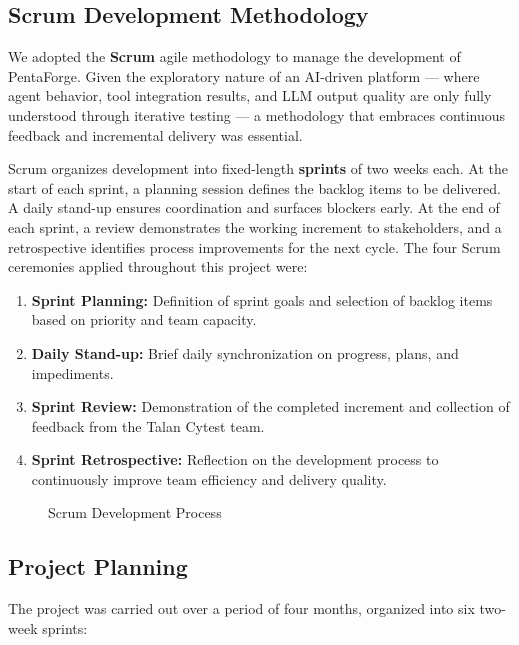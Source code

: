 \documentclass[12pt,a4paper]{report}
\begin{document}
\subsection{Scrum Development Methodology}

We adopted the \textbf{Scrum} agile methodology to manage the development of
PentaForge. Given the exploratory nature of an AI-driven platform --- where agent
behavior, tool integration results, and LLM output quality are only fully understood
through iterative testing --- a methodology that embraces continuous feedback and
incremental delivery was essential.

Scrum organizes development into fixed-length \textbf{sprints} of two weeks each.
At the start of each sprint, a planning session defines the backlog items to be
delivered. A daily stand-up ensures coordination and surfaces blockers early. At the
end of each sprint, a review demonstrates the working increment to stakeholders, and
a retrospective identifies process improvements for the next cycle. The four Scrum
ceremonies applied throughout this project were:

\begin{enumerate}
    \item \textbf{Sprint Planning:} Definition of sprint goals and selection of
    backlog items based on priority and team capacity.
    \item \textbf{Daily Stand-up:} Brief daily synchronization on progress,
    plans, and impediments.
    \item \textbf{Sprint Review:} Demonstration of the completed increment and
    collection of feedback from the Talan Cytest team.
    \item \textbf{Sprint Retrospective:} Reflection on the development process
    to continuously improve team efficiency and delivery quality.
\end{enumerate}

\begin{figure}[H]
    \centering
    \caption{Scrum Development Process}
    \label{fig:scrum}
\end{figure}

\subsection{Project Planning}

The project was carried out over a period of four months, organized into six
two-week sprints:
\end{document}
